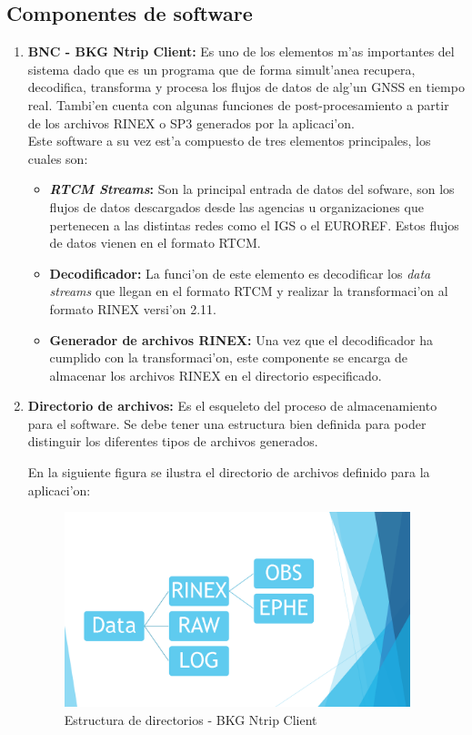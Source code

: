 \subsection{Componentes de software}
\begin{enumerate}
\item \textbf{BNC - BKG Ntrip Client:} Es uno de los elementos m'as importantes del sistema dado que es un programa que de forma simult'anea recupera, decodifica, transforma y procesa los flujos de datos de alg'un GNSS en tiempo real. Tambi'en cuenta con algunas funciones de post-procesamiento a partir de los archivos RINEX o SP3 generados por la aplicaci'on.\\

Este software a su vez est'a compuesto de tres elementos principales, los cuales son:
\begin{itemize}
\item \textbf{\emph{RTCM Streams}:} Son la principal entrada de datos del sofware, son los flujos de datos descargados desde las agencias u organizaciones que pertenecen a las distintas redes como el IGS o el EUROREF. Estos flujos de datos vienen en el formato RTCM.
\item \textbf{Decodificador:} La funci'on de este elemento es decodificar los \emph{data streams} que llegan en el formato RTCM y realizar la transformaci'on al formato RINEX versi'on 2.11.
\item \textbf{Generador de archivos RINEX:} Una vez que el decodificador ha cumplido con la transformaci'on, este componente se encarga de almacenar los archivos RINEX en el directorio especificado.
\end{itemize}
\item \textbf{Directorio de archivos:} Es el esqueleto del proceso de almacenamiento para el software. Se debe tener una estructura bien definida para poder distinguir los diferentes tipos de archivos generados.

En la siguiente figura se ilustra el directorio de archivos definido para la aplicaci'on:

\begin{figure}[H]
\centering
\includegraphics[width=0.95\textwidth]{images/Estructura_de_directorios}
\caption{Estructura de directorios - BKG Ntrip Client}
\label{fig:4.3}
\end{figure}


\end{enumerate}
